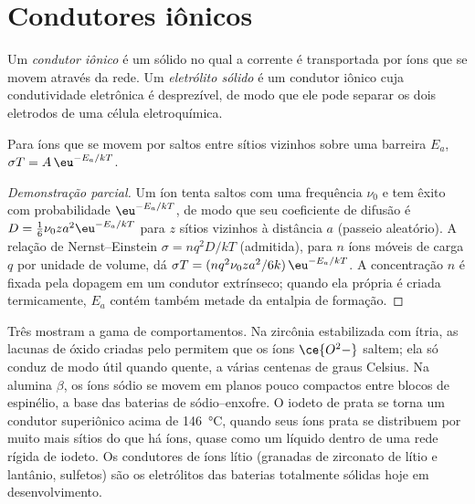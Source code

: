 \section{Condutores iônicos}

\begin{definition}\label{def:b3:solid-state:ionic-conductor}
Um \emph{condutor iônico} é um sólido no qual a corrente
é transportada por íons que se movem através da rede. Um \emph{eletrólito
sólido} é um condutor iônico cuja condutividade eletrônica
é desprezível, de modo que ele pode separar os dois eletrodos de uma
célula eletroquímica.
\end{definition}

\begin{proposition}\label{prop:b3:solid-state:ionic-arrhenius}
Para íons que se movem por saltos entre sítios vizinhos sobre uma barreira $E_a$,
$\sigma T = A\,\eu^{-E_a/kT}$.
\end{proposition}

\begin{proof}[Demonstração parcial]
Um íon tenta saltos com uma frequência $\nu_0$ e tem êxito com probabilidade $\eu^{-E_a/kT}$,
de modo que seu coeficiente de difusão é $D = \tfrac16\nu_0 z a^2\eu^{-E_a/kT}$ para $z$ sítios vizinhos à
distância $a$ (passeio aleatório). A relação de Nernst--Einstein $\sigma = nq^2D/kT$ (admitida), para $n$
íons móveis de carga $q$ por unidade de volume, dá $\sigma T = (nq^2\nu_0za^2/6k)\,\eu^{-E_a/kT}$. A
concentração $n$ é fixada pela dopagem em um condutor extrínseco; quando ela própria é
criada termicamente, $E_a$ contém também metade da entalpia de formação.
\end{proof}

Três  mostram a gama de comportamentos. Na zircônia estabilizada com ítria, as
lacunas de óxido criadas pelo  permitem que os íons $\ce{O^2-}$ saltem; ela só conduz de modo útil
quando quente, a várias centenas de graus Celsius. Na alumina $\beta$, os íons sódio se movem em
planos pouco compactos entre blocos de espinélio, a base das baterias de
sódio--enxofre. O iodeto de prata se torna um condutor superiônico acima de \qty{146}{\celsius},
quando seus íons prata se distribuem por muito mais sítios do que há íons,
quase como um líquido dentro de uma rede rígida de iodeto. Os condutores de íons lítio
(granadas de zirconato de lítio e lantânio, sulfetos) são os eletrólitos das
baterias totalmente sólidas hoje em desenvolvimento.

